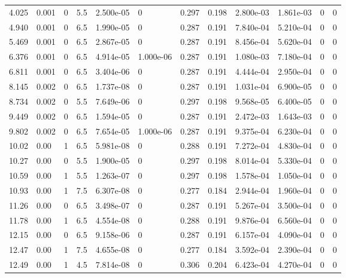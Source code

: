 \documentclass[preview]{standalone}
\begin{document}
{{\begin{tabular}{L{1.2cm}C{1.2cm} C{0.3cm}C{0.5cm} C{1.4cm}C{1.4cm} C{1.4cm}C{1.4cm} C{1.6cm}C{1.6cm} C{1.6cm}C{1.6cm}}
  4.025  &  0.001  & 0     & 5.5 &  2.500e-05  & 0  &  0.297&   0.198& 2.800e-03 & 1.861e-03   &  0 & 0  \\ 
  4.940  &  0.001  & 0     & 6.5 &  1.990e-05  & 0  &  0.287&   0.191& 7.840e-04 & 5.210e-04   &  0 & 0  \\ 
  5.469  &  0.001  & 0     & 6.5 &  2.867e-05  & 0  &  0.287&   0.191& 8.456e-04 & 5.620e-04   &  0 & 0  \\ 
  6.376  &  0.001  & 0     & 6.5 &  4.914e-05  & 1.000e-06  &  0.287&   0.191& 1.080e-03 & 7.180e-04   &  0 & 0  \\ 
  6.811  &  0.001  & 0     & 6.5 &  3.404e-06  & 0  &  0.287&   0.191& 4.444e-04 & 2.950e-04   &  0 & 0  \\ 
  8.145  &  0.002  & 0     & 6.5 &  1.737e-08  & 0  &  0.287&   0.191& 1.031e-04 & 6.900e-05   &  0 & 0  \\ 
  8.734  &  0.002  & 0     & 5.5 &  7.649e-06  & 0  &  0.297&   0.198& 9.568e-05 & 6.400e-05   &  0 & 0  \\ 
  9.449  &  0.002  & 0     & 6.5 &  1.594e-05  & 0  &  0.287&   0.191& 2.472e-03 & 1.643e-03   &  0 & 0  \\ 
  9.802  &  0.002  & 0     & 6.5 &  7.654e-05  & 1.000e-06  &  0.287&   0.191& 9.375e-04 & 6.230e-04   &  0 & 0  \\ 
  10.02  &  0.00  & 1     & 6.5 &  5.981e-08  & 0  &  0.288&   0.191& 7.272e-04 & 4.830e-04   &  0 & 0  \\ 
  10.27  &  0.00  & 0     & 5.5 &  1.900e-05  & 0  &  0.297&   0.198& 8.014e-04 & 5.330e-04   &  0 & 0  \\ 
  10.59  &  0.00  & 1     & 5.5 &  1.263e-07  & 0  &  0.297&   0.198& 1.578e-04 & 1.050e-04   &  0 & 0  \\ 
  10.93  &  0.00  & 1     & 7.5 &  6.307e-08  & 0  &  0.277&   0.184& 2.944e-04 & 1.960e-04   &  0 & 0  \\ 
  11.26  &  0.00  & 0     & 6.5 &  3.498e-07  & 0  &  0.287&   0.191& 5.267e-04 & 3.500e-04   &  0 & 0  \\ 
  11.78  &  0.00  & 1     & 6.5 &  4.554e-08  & 0  &  0.288&   0.191& 9.876e-04 & 6.560e-04   &  0 & 0  \\ 
  12.15  &  0.00  & 0     & 6.5 &  9.158e-06  & 0  &  0.287&   0.191& 6.157e-04 & 4.090e-04   &  0 & 0  \\ 
  12.47  &  0.00  & 1     & 7.5 &  4.655e-08  & 0  &  0.277&   0.184& 3.592e-04 & 2.390e-04   &  0 & 0  \\ 
  12.49  &  0.00  & 1     & 4.5 &  7.814e-08  & 0  &  0.306&   0.204& 6.423e-04 & 4.270e-04   &  0 & 0  \\ 

\end{tabular}}}
\end{document}
